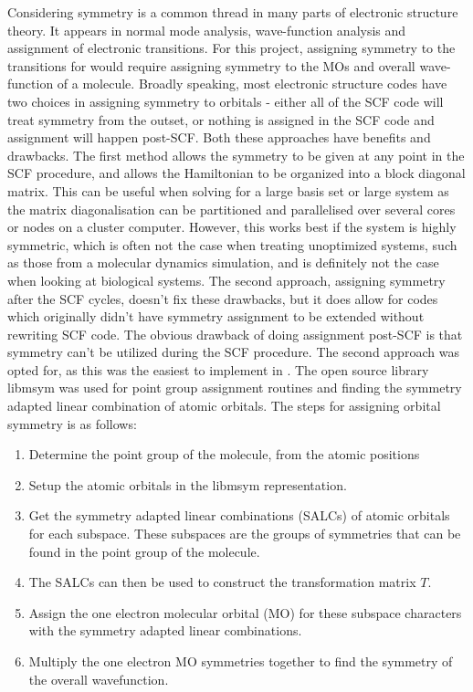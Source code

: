Considering symmetry is a common thread in many parts of electronic structure 
theory. It appears in normal mode analysis, wave-function analysis and assignment
of electronic transitions. For this project, assigning symmetry to the transitions
for \dscf would require assigning symmetry to the MOs and overall wave-function of
a molecule.
Broadly speaking, most electronic structure codes have two choices in assigning
symmetry to orbitals - either all of the SCF code will treat symmetry from the 
outset, or nothing is assigned in the SCF code and assignment will happen post-SCF.
Both these approaches have benefits and drawbacks. The first method allows the 
symmetry to be given at any point in the SCF procedure, and allows the Hamiltonian
to be organized into a block diagonal matrix. This can be useful when solving
for a large basis set or large system as the matrix diagonalisation can be
partitioned and parallelised over several cores or nodes on a cluster computer.
However, this works best if the system is highly symmetric, which is often not
the case when treating unoptimized systems, such as those from a molecular dynamics
simulation, and is definitely not the case when looking at biological systems.
The second approach, assigning symmetry after the SCF cycles, doesn't fix these
drawbacks, but it does allow for codes which originally didn't have symmetry
assignment to be extended without rewriting SCF code. The obvious drawback of
doing assignment post-SCF is that symmetry can't be utilized during the SCF procedure.
The second approach was opted for, as this was the easiest to implement in .
The open source library libmsym \cite{libmsym} was used for point group assignment
routines and finding the symmetry adapted linear combination of atomic orbitals.
The steps for assigning orbital symmetry is as follows:

\begin{enumerate}
    \item Determine the point group of the molecule, from the atomic positions
    \item Setup the atomic orbitals in the libmsym representation.
    \item Get the symmetry adapted linear combinations (SALCs) of atomic orbitals for 
    each subspace. These subspaces are the groups of symmetries that can be found
    in the point group of the molecule.
    \item The SALCs can then be used to construct the transformation matrix $T$.
    \item Assign the one electron molecular orbital (MO) for these subspace characters
     with the symmetry adapted linear combinations.
    \item Multiply the one electron MO symmetries together to find the symmetry 
    of the overall wavefunction.
\end{enumerate}

